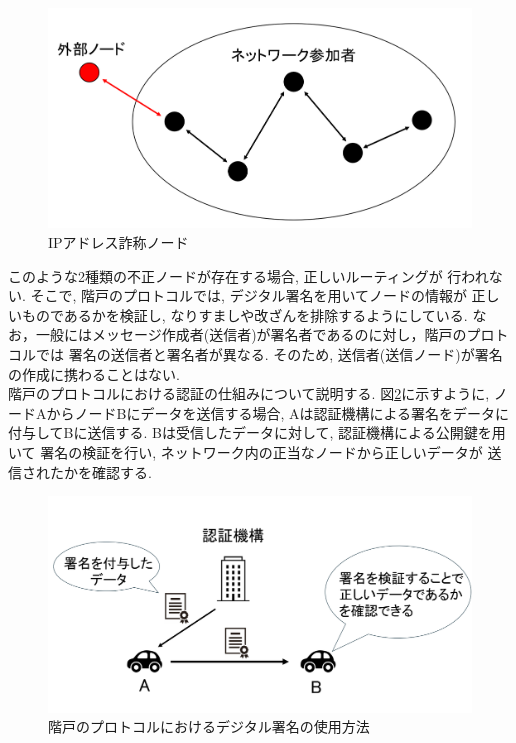 \begin{figure}
  \centering
  \includegraphics[scale=0.6]{figures/ip-liar.png}
  \caption{IPアドレス詐称ノード}
  \label{fig:ip-liar}
\end{figure}

\indent このような2種類の不正ノードが存在する場合, 正しいルーティングが
行われない. そこで, 階戸のプロトコルでは, デジタル署名を用いてノードの情報が
正しいものであるかを検証し, なりすましや改ざんを排除するようにしている. 
なお，一般にはメッセージ作成者(送信者)が署名者であるのに対し，階戸のプロトコルでは
署名の送信者と署名者が異なる. そのため, 送信者(送信ノード)が署名の作成に携わることはない.  \\
\indent 階戸のプロトコルにおける認証の仕組みについて説明する. 図\ref{fig:signature-method}に示すように, 
ノードAからノードBにデータを送信する場合, Aは認証機構による署名をデータに
付与してBに送信する. Bは受信したデータに対して, 認証機構による公開鍵を用いて
署名の検証を行い, ネットワーク内の正当なノードから正しいデータが
送信されたかを確認する. 
\newpage

\begin{figure}
  \centering
  \includegraphics[scale=0.6]{figures/signature-method.png}
  \caption{階戸のプロトコルにおけるデジタル署名の使用方法\cite{shinato}}
  \label{fig:signature-method}
\end{figure}

